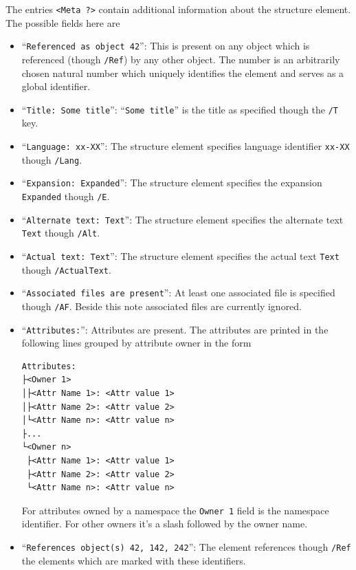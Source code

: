 \documentclass[a4paper]{article}
\begin{document}
The entries \texttt{<Meta ?>} contain additional information about the structure element.
The possible fields here are
\begin{itemize}
  \item \enquote{\texttt{Referenced as object 42}}: This is present on any object which is referenced (though \texttt{/Ref}) by any other object.
    The number is an arbitrarily chosen natural number which uniquely identifies the element and serves as a global identifier.
  \item \enquote{\texttt{Title: Some title}}: \enquote{\texttt{Some title}} is the title as specified though the \texttt{/T} key.
  \item \enquote{\texttt{Language: xx-XX}}: The structure element specifies language identifier \texttt{xx-XX} though \texttt{/Lang}.
  \item \enquote{\texttt{Expansion: Expanded}}: The structure element specifies the expansion \texttt{Expanded} though \texttt{/E}.
  \item \enquote{\texttt{Alternate text: Text}}: The structure element specifies the alternate text \texttt{Text} though \texttt{/Alt}.
  \item \enquote{\texttt{Actual text: Text}}: The structure element specifies the actual text \texttt{Text} though \texttt{/ActualText}.
  \item \enquote{\texttt{Associated files are present}}: At least one associated file is specified though \texttt{/AF}.
    Beside this note associated files are currently ignored.
  \item \enquote{\texttt{Attributes:}}: Attributes are present. The attributes are printed in the following lines grouped by attribute owner in the form
    \begin{verbatim}
Attributes:
├<Owner 1>
│├<Attr Name 1>: <Attr value 1>
│├<Attr Name 2>: <Attr value 2>
│└<Attr Name n>: <Attr value n>
├...
└<Owner n>
 ├<Attr Name 1>: <Attr value 1>
 ├<Attr Name 2>: <Attr value 2>
 └<Attr Name n>: <Attr value n>
    \end{verbatim}
    For attributes owned by a namespace the \texttt{Owner 1} field is the namespace identifier.
    For other owners it's a slash followed by the owner name.
  \item \enquote{\texttt{References object(s) 42, 142, 242}}: The element references though \texttt{/Ref} the elements which are marked with these identifiers.
\end{itemize}
\end{document}
